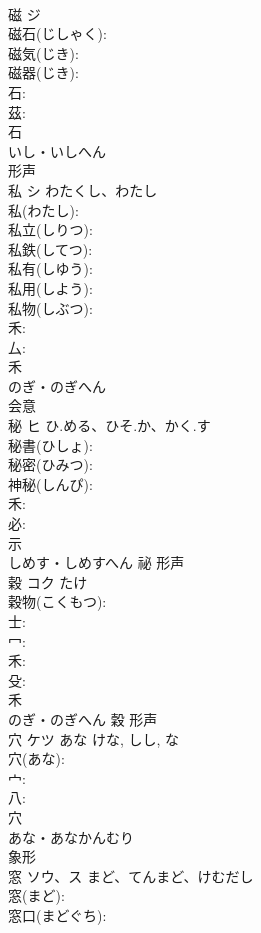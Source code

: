 \documentclass[8pt]{extreport}
\begin{document}
\begin{CJK}{UTF8}{min}
\\	磁	ジ			
\\	磁石(じしゃく): 
\\	磁気(じき): 
\\	磁器(じき): 
\\	石: 
\\	茲: 
\\	石	
\\	いし・いしへん	
\\	形声 
\\	私	シ	わたくし、わたし		
\\	私(わたし): 
\\	私立(しりつ): 
\\	私鉄(してつ): 
\\	私有(しゆう): 
\\	私用(しよう): 
\\	私物(しぶつ): 
\\	禾: 
\\	厶: 
\\	禾	
\\	のぎ・のぎへん	
\\	会意 
\\	秘	ヒ	ひ.める、ひそ.か、かく.す		
\\	秘書(ひしょ): 
\\	秘密(ひみつ): 
\\	神秘(しんぴ): 
\\	禾: 
\\	必: 
\\	示	
\\	しめす・しめすへん	祕	形声 
\\	穀	コク		たけ	
\\	穀物(こくもつ): 
\\	士: 
\\	冖: 
\\	禾: 
\\	殳: 
\\	禾	
\\	のぎ・のぎへん	穀	形声 
\\	穴	ケツ	あな	けな, しし, な	
\\	穴(あな): 
\\	宀: 
\\	八: 
\\	穴	
\\	あな・あなかんむり	
\\	象形 
\\	窓	ソウ、ス	まど、てんまど、けむだし		
\\	窓(まど): 
\\	窓口(まどぐち): 

\end{CJK}
\end{document}
